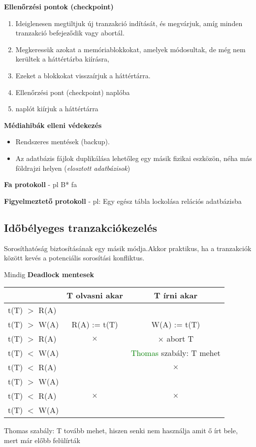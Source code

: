 \textbf{Ellenőrzési pontok (checkpoint) }\setlength\itemsep{0.5mm}

\begin{enumerate}
	\item Ideiglenesen megtiltjuk új tranzakció indítását, és megvárjuk, amíg minden tranzakció befejeződik vagy abortál.
	\item Megkeressük azokat a memóriablokkokat, amelyek módosultak, de még nem kerültek a háttértárba kiírásra,
	\item Ezeket a blokkokat visszaírjuk a háttértárra.
	\item Ellenőrzési pont (checkpoint) naplóba
	\item naplót kiírjuk a háttértárra
\end{enumerate}

\textbf{Médiahibák elleni védekezés}

\begin{itemize}
	\item Rendszeres mentések (backup).
	\item Az adatbázis fájlok duplikálása lehetőleg egy másik fizikai eszközön, néha más földrajzi helyen (\textit{elosztott adatbázisok})
\end{itemize}

\textbf{Fa protokoll} - pl B* fa

\textbf{Figyelmeztető protokoll} - pl: Egy egész tábla lockolása relációs adatbázisba

\subsection{Időbélyeges tranzakciókezelés}

	Sorosíthatóság biztosításának egy másik módja.Akkor praktikus, ha a tranzakciók között kevés a potenciális sorosítási konfliktus.

	Mindig \textbf{Deadlock mentesek}

	\begin{center}
		\begin{tabular}{|l||c|c|}
 			 \hline
 			 & T olvasni akar & T írni akar\\ \hline \hline
 			 t(T) $>$ R(A) & \checkmark & \checkmark \\
 			 t(T) $>$ W(A) & R(A) := t(T) & W(A) := t(T) \\ \hline

 			 t(T) $>$ R(A) & $\times$ & $\times$ abort T \\
 			 t(T) $<$ W(A) & & \textcolor{green}{Thomas} szabály: T mehet \\ \hline

 			 t(T) $<$ R(A) & \checkmark & $\times$ \\
 			 t(T) $>$ W(A) & & \\ \hline

 			 t(T) $<$ R(A) & $\times$ & $\times$ \\
 			 t(T) $<$ W(A) & & \\ \hline
 		\end{tabular}

 		\small Thomas szabály: T tovább mehet, hiszen senki nem használja amit ő írt bele, mert már előbb felülírták \normalsize
 	\end{center}


